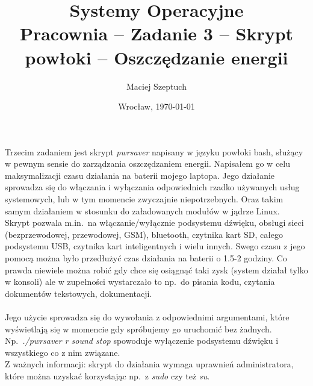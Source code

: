 \documentclass[12pt,leqno]{article}
\title{\LARGE \textbf{{Systemy Operacyjne}}\\
      {\Large Pracownia -- Zadanie 3 -- Skrypt powłoki -- Oszczędzanie energii}\\
}
\author{Maciej Szeptuch}
\date{Wrocław, \today}
\begin{document}
\thispagestyle{empty}
\maketitle

Trzecim zadaniem jest skrypt \textit{pwrsaver} napisany w języku powłoki bash,
służący w pewnym sensie do zarządzania oszczędzaniem energii. Napisałem go
w celu maksymalizacji czasu działania na baterii mojego laptopa. Jego działanie
sprowadza się do włączania i wyłączania odpowiednich rzadko używanych usług
systemowych, lub w tym momencie zwyczajnie niepotrzebnych. Oraz takim samym
działaniem w stosunku do załadowanych modułów w jądrze Linux. \\
Skrypt pozwala m.in.\ na włączanie/wyłącznie podsystemu dźwięku, obsługi sieci
(bezprzewodowej, przewodowej, GSM), bluetooth, czytnika kart SD, całego
podsystemu USB, czytnika kart inteligentnych i wielu innych. Swego czasu z jego
pomocą można było przedłużyć czas działania na baterii o 1.5-2 godziny. Co prawda
niewiele można robić gdy chce się osiągnąć taki zysk (system działał tylko w konsoli)
ale w zupełności wystarczało to np.\ do pisania kodu, czytania dokumentów tekstowych,
dokumentacji. \\
\\
Jego użycie sprowadza się do wywołania z odpowiednimi argumentami, które wyświetlają
się w momencie gdy spróbujemy go uruchomić bez żadnych. Np.\ \textit{./pwrsaver r sound stop}
spowoduje wyłączenie podsystemu dźwięku i wszystkiego co z nim związane. \\
Z ważnych informacji: skrypt do działania wymaga uprawnień administratora, które można
uzyskać korzystając np.\ z \textit{sudo} czy też \textit{su}.
\end{document}
